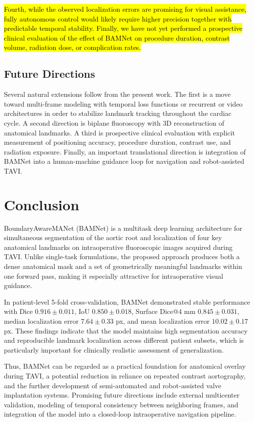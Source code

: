\documentclass[utf8]{FrontiersinHarvard}
\begin{document}
\hl{Fourth, while the observed localization errors are promising for visual assistance, fully autonomous control would likely require 
higher precision together with predictable temporal stability. Finally, we have not yet performed a prospective clinical evaluation 
of the effect of BAMNet on procedure duration, contrast volume, radiation dose, or complication rates.}

\subsection{Future Directions}

Several natural extensions follow from the present work. The first is a move toward multi-frame modeling with 
temporal loss functions or recurrent or video architectures in order to stabilize landmark tracking throughout 
the cardiac cycle. A second direction is biplane fluoroscopy with 3D reconstruction of anatomical landmarks. 
A third is prospective clinical evaluation with explicit measurement of positioning accuracy, procedure duration, 
contrast use, and radiation exposure. Finally, an important translational direction is integration of BAMNet 
into a human-machine guidance loop for navigation and robot-assisted TAVI.

\section{Conclusion}

BoundaryAwareMANet (BAMNet) is a multitask deep learning architecture for simultaneous segmentation of the aortic root and localization 
of four key anatomical landmarks on intraoperative fluoroscopic images acquired during TAVI. Unlike single-task formulations, the 
proposed approach produces both a dense anatomical mask and a set of geometrically meaningful landmarks within one forward pass, making 
it especially attractive for intraoperative visual guidance.

In patient-level 5-fold cross-validation, BAMNet demonstrated stable performance with Dice $0.916 \pm 0.011$, IoU $0.850 \pm 0.018$, 
Surface Dice@4 mm $0.845 \pm 0.031$, median localization error $7.64 \pm 0.33$ px, and mean localization error $10.02 \pm 0.17$ px. 
These findings indicate that the model maintains high segmentation accuracy and reproducible landmark localization across different 
patient subsets, which is particularly important for clinically realistic assessment of generalization.

Thus, BAMNet can be regarded as a practical foundation for anatomical overlay during TAVI, a potential reduction in reliance on 
repeated contrast aortography, and the further development of semi-automated and robot-assisted valve implantation systems. 
Promising future directions include external multicenter validation, modeling of temporal consistency between neighboring frames, 
and integration of the model into a closed-loop intraoperative navigation pipeline.
\end{document}
